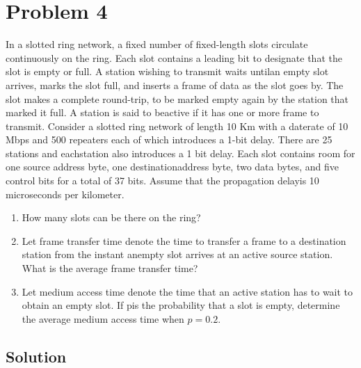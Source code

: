 
\section*{Problem 4}

In a slotted ring network, a fixed number of fixed-length slots circulate continuously on the ring.
Each slot contains a leading bit to designate that the slot is empty or full.
A station wishing to transmit waits untilan empty slot arrives, marks the slot full, and inserts a frame of data as the slot goes by.
The slot makes a complete round-trip, to be marked empty again by the station that marked it full.
A station is said to beactive if it has one or more frame to transmit. 
Consider a slotted ring network of length 10 Km with a daterate of 10 Mbps and 500 repeaters each of which introduces a 1-bit delay.
There are 25 stations and eachstation also introduces a 1 bit delay.
Each slot contains room for one source address byte, one destinationaddress byte, two data bytes, and five control bits for a total of 37 bits.
Assume that the propagation delayis 10 microseconds per kilometer.

\begin{enumerate}
    \item How many slots can be there on the ring?
    \item Let frame transfer time denote the time to transfer a frame to a destination station from the instant anempty slot arrives at an active source station. What is the average frame transfer time?
    \item Let medium access time denote the time that an active station has to wait to obtain an empty slot.
          If pis the probability that a slot is empty, determine the average medium access time when $p = 0.2$.
\end{enumerate}

\subsection*{Solution}
